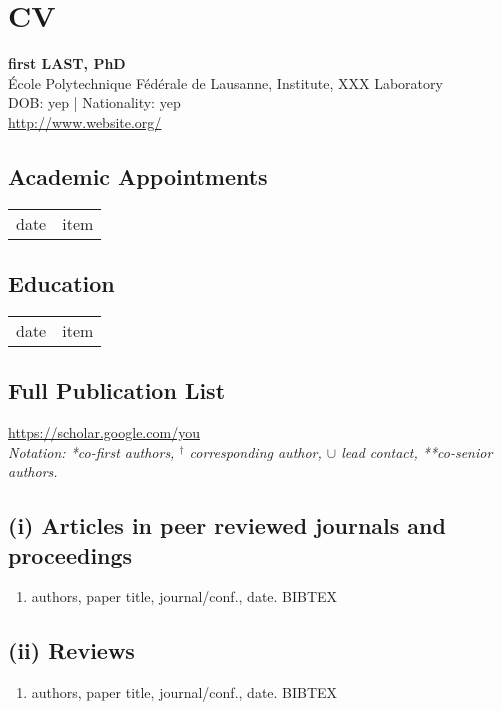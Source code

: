 \chapter{CV}
\label{cv}

\vspace{-10mm}

\large \textbf{first LAST, PhD
}\\
École Polytechnique Fédérale de Lausanne, 
Institute,
XXX Laboratory	\\	
DOB: yep | Nationality: yep\\
\url{http://www.website.org/}

\section{Academic Appointments}							
\begin{tabular}[l]{ p{} p{} }
date & item\\
\end{tabular} 

\section{Education}								
\begin{tabular}[l]{ p{} p{} }
date & item\\
\end{tabular} 

\section{Full Publication List}	

\url{https://scholar.google.com/you}\\

\small \textit{Notation: *co-first authors, $^\dagger$ corresponding author, $\cup$ lead contact, **co-senior authors.}


\section{(i) Articles in peer reviewed journals and proceedings}

\begin{enumerate}
\item authors, paper title, journal/conf., date. BIBTEX
\end{enumerate}

\section{(ii) Reviews}
\begin{enumerate}
\item authors, paper title, journal/conf., date. BIBTEX
\end{enumerate}

